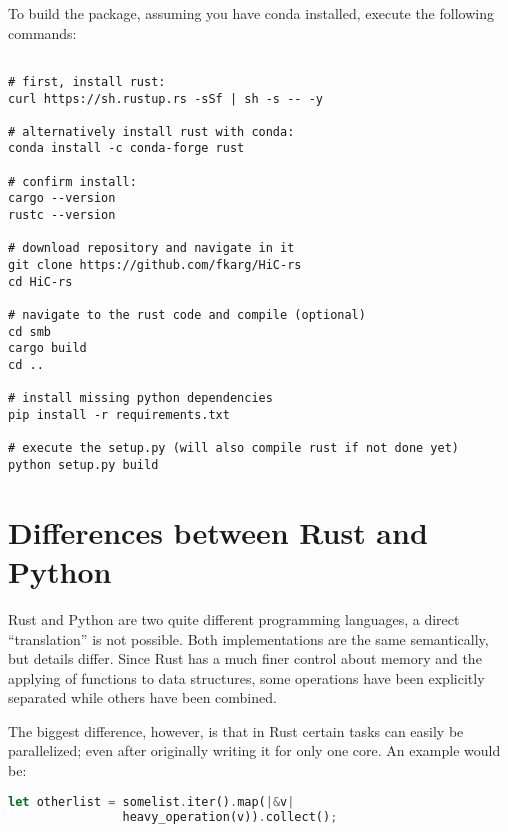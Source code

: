 To build the package, assuming you have conda installed, execute the following
commands:

\begin{verbatim}

# first, install rust:
curl https://sh.rustup.rs -sSf | sh -s -- -y

# alternatively install rust with conda:
conda install -c conda-forge rust

# confirm install:
cargo --version
rustc --version

# download repository and navigate in it
git clone https://github.com/fkarg/HiC-rs
cd HiC-rs

# navigate to the rust code and compile (optional)
cd smb
cargo build
cd ..

# install missing python dependencies
pip install -r requirements.txt

# execute the setup.py (will also compile rust if not done yet)
python setup.py build

\end{verbatim}








\newpage
\section{Differences between Rust and Python}\label{sec:differences}

Rust and Python are two quite different programming languages, a direct
``translation'' is not possible. Both implementations are the same semantically,
but details differ. Since Rust has a much finer control about memory and the
applying of functions to data structures, some operations have been explicitly
separated while others have been combined.

The biggest difference, however, is that in Rust certain tasks can easily be
parallelized; even after originally writing it for only one core. An example
would be:

\vline
\begin{lstlisting}[language=Rust]
let otherlist = somelist.iter().map(|&v|
                heavy_operation(v)).collect();
\end{lstlisting}
\vline

